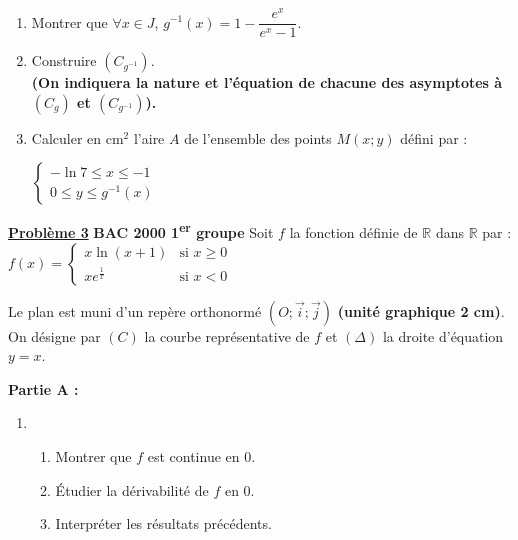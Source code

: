 \documentclass[12pt,a4paper]{article}
\newcommand{\exo}[1]{%
        \textbf{\underline{Problème #1}}
}
\begin{document}
\begin{multicols}{2}
\begin{enumerate}
    \item Montrer que \( \forall x \in J \), \( g^{-1}(x) = 1 - \dfrac{e^x}{e^x - 1} \).

    \item Construire \( (C_{g^{-1}}) \).\\
    \textbf{(On indiquera la nature et l’équation de chacune des asymptotes à \( (C_g) \) et \( (C_{g^{-1}}) \)).}
\item Calculer en \( \text{cm}^2 \) l’aire \( A \) de l’ensemble des points \( M(x ; y) \) défini par :

\(
\left\{
\begin{array}{l}
-\ln 7 \leq x \leq -1 \\
0 \leq y \leq g^{-1}(x)
\end{array}
\right.
\)

\end{enumerate}

\exo{3} \textbf{BAC 2000 1\textsuperscript{er} groupe}
Soit \( f \) la fonction définie de \( \mathbb{R} \) dans \( \mathbb{R} \) par :\\
\(
f(x) =
\begin{cases}
x \ln(x+1) & \text{si } x \geq 0 \\
x e^{\frac{1}{x}} & \text{si } x < 0
\end{cases}
\)

Le plan est muni d’un repère orthonormé \( (O ; \vec{i} ; \vec{j}) \) \textbf{(unité graphique 2 cm)}.\\
On désigne par \( (C) \) la courbe représentative de \( f \) et \( (\Delta) \) la droite d’équation \( y = x \).

\textbf{Partie A :}
\begin{enumerate}
    \item 
    \begin{enumerate}
        \item Montrer que \( f \) est continue en 0.
        \item Étudier la dérivabilité de \( f \) en 0.
        \item Interpréter les résultats précédents.
    \end{enumerate}


\end{enumerate}
\end{multicols}
\end{document}
